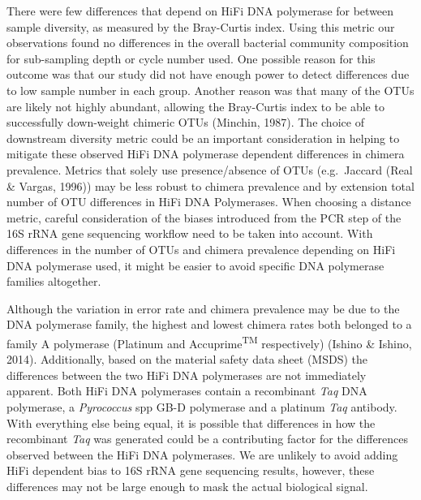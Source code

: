 \documentclass[12pt,]{article}
\begin{document}
There were few differences that depend on HiFi DNA polymerase for
between sample diversity, as measured by the Bray-Curtis index. Using
this metric our observations found no differences in the overall
bacterial community composition for sub-sampling depth or cycle number
used. One possible reason for this outcome was that our study did not
have enough power to detect differences due to low sample number in each
group. Another reason was that many of the OTUs are likely not highly
abundant, allowing the Bray-Curtis index to be able to successfully
down-weight chimeric OTUs (Minchin, 1987). The choice of downstream
diversity metric could be an important consideration in helping to
mitigate these observed HiFi DNA polymerase dependent differences in
chimera prevalence. Metrics that solely use presence/absence of OTUs
(e.g.~Jaccard (Real \& Vargas, 1996)) may be less robust to chimera
prevalence and by extension total number of OTU differences in HiFi DNA
Polymerases. When choosing a distance metric, careful consideration of
the biases introduced from the PCR step of the 16S rRNA gene sequencing
workflow need to be taken into account. With differences in the number
of OTUs and chimera prevalence depending on HiFi DNA polymerase used, it
might be easier to avoid specific DNA polymerase families altogether.

Although the variation in error rate and chimera prevalence may be due
to the DNA polymerase family, the highest and lowest chimera rates both
belonged to a family A polymerase (Platinum and
Accuprime\textsuperscript{TM} respectively) (Ishino \& Ishino, 2014).
Additionally, based on the material safety data sheet (MSDS) the
differences between the two HiFi DNA polymerases are not immediately
apparent. Both HiFi DNA polymerases contain a recombinant \emph{Taq} DNA
polymerase, a \emph{Pyrococcus} spp GB-D polymerase and a platinum
\emph{Taq} antibody. With everything else being equal, it is possible
that differences in how the recombinant \emph{Taq} was generated could
be a contributing factor for the differences observed between the HiFi
DNA polymerases. We are unlikely to avoid adding HiFi dependent bias to
16S rRNA gene sequencing results, however, these differences may not be
large enough to mask the actual biological signal.
\end{document}
